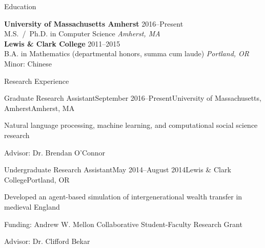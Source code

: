 \documentclass{resume} %
\begin{document}
%


\begin{rSection}{Education}

{\bf University of Massachusetts Amherst} \hfill {2016--Present} \\ 
M.S.~/~Ph.D. in Computer Science \hfill {\em Amherst, MA} \\

{\bf Lewis \& Clark College} \hfill {2011--2015} \\ 
B.A. in Mathematics (departmental honors, summa cum laude) \hfill {\em Portland, OR} \\
Minor: Chinese \\

\end{rSection}


\begin{rSection}{Research Experience}

\begin{rSubsection}{Graduate Research Assistant}{September 2016--Present}{University of Massachusetts, Amherst}{Amherst, MA}
\item Natural language processing, machine learning, and computational social science research
\item Advisor: Dr. Brendan O'Connor 
\end{rSubsection}


\begin{rSubsection}{Undergraduate Research Assistant}{May 2014--August 2014}{Lewis \& Clark College}{Portland, OR}
\item Developed an agent-based simulation of intergenerational wealth transfer in medieval England
\item Funding: Andrew W. Mellon Collaborative Student-Faculty Research Grant
\item Advisor: Dr. Clifford Bekar
\end{rSubsection}

\end{rSection}
\end{document}
